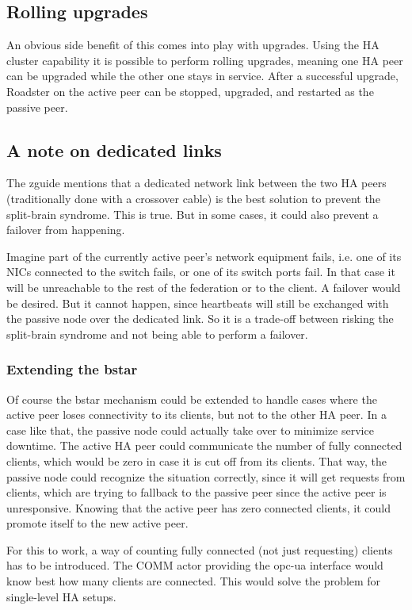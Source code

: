 \subsection{Rolling upgrades}
An obvious side benefit of this comes into play with upgrades. Using the HA
cluster capability it is possible to perform rolling upgrades, meaning one HA
peer can be upgraded while the other one stays in service. After a successful
upgrade, Roadster on the active peer can be stopped, upgraded, and restarted as
the passive peer.

\subsection{A note on dedicated links}
The \gls{zguide} mentions that a dedicated network link between the two HA peers
(traditionally done with a crossover cable) is the best solution to prevent the
split-brain syndrome. This is true. But in some cases, it could also prevent a
failover from happening.

Imagine part of the currently active peer's network equipment fails, i.e. one
of its \glspl{NIC} connected to the switch fails, or one of its switch ports
fail. In that case it will be unreachable to the rest of the
federation or to the client. A failover would be desired. But it
cannot happen, since heartbeats will still be exchanged with the passive node over
the dedicated link. So it is a trade-off between risking the split-brain
syndrome and not being able to perform a failover.

\subsubsection{Extending the \gls{bstar}}\label{sec:approach:ha:bstar-ext}
Of course the \gls{bstar} mechanism could be extended to handle cases where the
active peer loses connectivity to its clients, but not to the other HA peer. In
a case like that, the passive node could actually take over to minimize
service downtime. The active HA peer could communicate the number of fully connected clients,
which would be zero in case it is cut off from its clients. That way, the
passive node could recognize the situation correctly, since it will get
requests from clients, which are trying to fallback to the passive peer since
the active peer is unresponsive. Knowing that the active peer has zero
connected clients, it could promote itself to the new active peer.

For this to work, a way of counting fully connected (not just requesting)
clients has to be introduced. The COMM actor providing the \gls{opc-ua}
interface would know best how many clients are connected. This would solve the problem for single-level HA setups.


